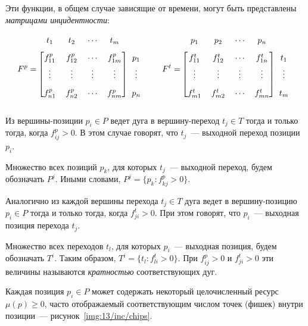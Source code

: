 Эти функции, в общем случае зависящие от времени, могут быть представлены \textit{матрицами инцидентности}:
%
\begin{equation*}
    \renewcommand*{\arraystretch}{1.75}
    F^p = \begin{blockarray}{ccccc}
        t_1 & t_2 & \cdots & t_m & \\
        \begin{block}{[cccc]c}
            f_{11}^p & f_{12}^p & \cdots & f_{1m}^p & p_1\\
            \vdots & \vdots & \vdots & \vdots & \vdots\\
            f_{n1}^p & f_{n2}^p & \cdots & f_{nm}^p & p_n\\
        \end{block}
    \end{blockarray}
    \quad\quad
    F^t = \begin{blockarray}{ccccc}
        p_1 & p_2 & \cdots & p_n & \\
        \begin{block}{[cccc]c}
            f_{11}^t & f_{12}^t & \cdots & f_{1n}^t & t_1\\
            \vdots & \vdots & \vdots & \vdots & \vdots\\
            f_{m1}^t & f_{m2}^t & \cdots & f_{mn}^t & t_m\\
        \end{block}
    \end{blockarray}
\end{equation*}
%
Из вершины-позиции ${p_i\in P}$ ведет дуга в вершину-переход ${t_j\in T}$ тогда и только тогда, когда ${f_{ij}^p > 0}$. В этом случае говорят, что $t_j$~--- выходной переход позиции $p_i$.

Множество всех позиций $p_k$, для которых $t_j$~--- выходной переход, будем обозначать $P^j$. Иными словами, ${P^j = \{p_k\colon f_{kj}^p > 0 \}}$.

Аналогично из каждой вершины перехода ${t_j\in T}$ дуга ведет в вершину-позицию ${p_i\in P}$ тогда и только тогда, когда ${f_{ji}^t > 0}$. При этом говорят, что $p_i$~--- выходная позиция перехода $t_j$.

Множество всех переходов $t_l$, для которых $p_i$~--- выходная позиция, будем обозначать $T^i$. Таким образом, ${T^i = \{ t_l\colon f_{li}^t > 0 \}}$. При ${f_{ij}^p > 0}$ и ${f_{ji}^t > 0}$ эти величины называются \textit{кратностью} соответствующих дуг.

Каждая позиция ${p_i\in P}$ может содержать некоторый целочисленный ресурс ${\mu(p)\geqslant 0}$, часто отображаемый соответствующим числом точек (фишек) внутри позиции~--- рисунок~\ref{img:13/inc/chips}.

